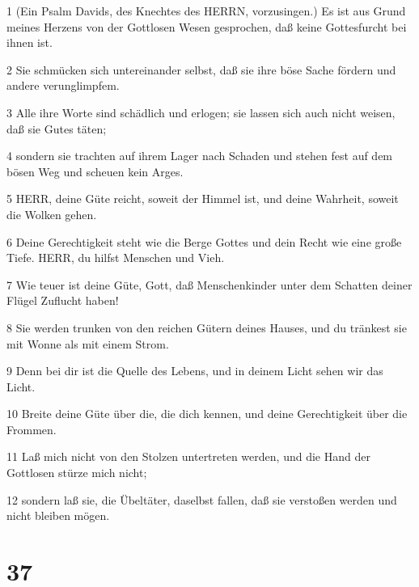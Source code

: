 \par 1 (Ein Psalm Davids, des Knechtes des HERRN, vorzusingen.) Es ist aus Grund meines Herzens von der Gottlosen Wesen gesprochen, daß keine Gottesfurcht bei ihnen ist.
\par 2 Sie schmücken sich untereinander selbst, daß sie ihre böse Sache fördern und andere verunglimpfem.
\par 3 Alle ihre Worte sind schädlich und erlogen; sie lassen sich auch nicht weisen, daß sie Gutes täten;
\par 4 sondern sie trachten auf ihrem Lager nach Schaden und stehen fest auf dem bösen Weg und scheuen kein Arges.
\par 5 HERR, deine Güte reicht, soweit der Himmel ist, und deine Wahrheit, soweit die Wolken gehen.
\par 6 Deine Gerechtigkeit steht wie die Berge Gottes und dein Recht wie eine große Tiefe. HERR, du hilfst Menschen und Vieh.
\par 7 Wie teuer ist deine Güte, Gott, daß Menschenkinder unter dem Schatten deiner Flügel Zuflucht haben!
\par 8 Sie werden trunken von den reichen Gütern deines Hauses, und du tränkest sie mit Wonne als mit einem Strom.
\par 9 Denn bei dir ist die Quelle des Lebens, und in deinem Licht sehen wir das Licht.
\par 10 Breite deine Güte über die, die dich kennen, und deine Gerechtigkeit über die Frommen.
\par 11 Laß mich nicht von den Stolzen untertreten werden, und die Hand der Gottlosen stürze mich nicht;
\par 12 sondern laß sie, die Übeltäter, daselbst fallen, daß sie verstoßen werden und nicht bleiben mögen.

\chapter{37}


